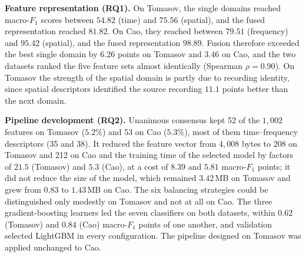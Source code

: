 \textbf{Feature representation (RQ1).} On Tomasov, the single domains reached macro-$F_1$ scores between $54.82$ (time) and $75.56$ (spatial), and the fused representation reached $81.82$. On Cao, they reached between $79.51$ (frequency) and $95.42$ (spatial), and the fused representation $98.89$. Fusion therefore exceeded the best single domain by $6.26$ points on Tomasov and $3.46$ on Cao, and the two datasets ranked the five feature sets almost identically (Spearman $\rho = 0.90$). On Tomasov the strength of the spatial domain is partly due to recording identity, since spatial descriptors identified the source recording $11.1$ points better than the next domain.

\textbf{Pipeline development (RQ2).} Unanimous consensus kept 52 of the $1{,}002$ features on Tomasov ($5.2\%$) and 53 on Cao ($5.3\%$), most of them time--frequency descriptors (35 and 38). It reduced the feature vector from $4{,}008$ bytes to 208 on Tomasov and 212 on Cao and the training time of the selected model by factors of $21.5$ (Tomasov) and $5.3$ (Cao), at a cost of $8.39$ and $5.81$ macro-$F_1$ points; it did not reduce the size of the model, which remained $3.42$\,MB on Tomasov and grew from $0.83$ to $1.43$\,MB on Cao. The six balancing strategies could be distinguished only modestly on Tomasov and not at all on Cao. The three gradient-boosting learners led the seven classifiers on both datasets, within $0.62$ (Tomasov) and $0.84$ (Cao) macro-$F_1$ points of one another, and validation selected LightGBM in every configuration. The pipeline designed on Tomasov was applied unchanged to Cao.


